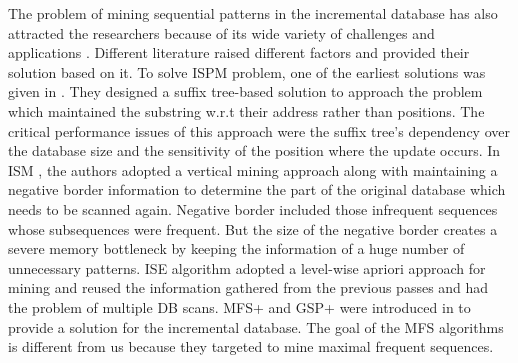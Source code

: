 The problem of mining sequential patterns in the incremental database has also attracted the researchers because of its wide variety of challenges and applications \cite{mallick2013incremental,slimani2013sequential}. Different literature raised different factors and provided their solution based on it. To solve ISPM problem, one of the earliest solutions was given in \cite{wang1997discovering}. They designed a suffix tree-based solution to approach the problem which maintained the substring w.r.t their address rather than positions. The critical performance issues of this approach were the suffix tree's dependency over the database size and the sensitivity of the position where the update occurs. In ISM \cite{parthasarathy1999incremental}, the authors adopted a vertical mining approach along with maintaining a negative border information to determine the part of the original database which needs to be scanned again. Negative border included those infrequent sequences whose subsequences were frequent. But the size of the negative border creates a severe memory bottleneck by keeping the information of a huge number of unnecessary patterns. ISE \cite{masseglia2003incremental} algorithm adopted a level-wise apriori approach for mining and reused the information gathered from the previous passes and had the problem of multiple DB scans. MFS+ and GSP+ were introduced in \cite{zhang2002efficient} to provide a solution for the incremental database. The goal of the MFS algorithms is different from us because they targeted to mine maximal frequent sequences.

